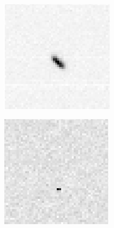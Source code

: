 \begin{figure}[!h]
\begin{subfigure}[t]{.23\textwidth}
        \caption{}
    \end{subfigure}
    \begin{subfigure}[t]{.23\textwidth}
        \centering
        \includegraphics[width=\textwidth]{images/mwrongImage26.png}
        \caption{}
        \label{fig:streakpointmis2}
    \end{subfigure}
    \begin{subfigure}[t]{.23\textwidth}
        \centering
        \includegraphics[width=\textwidth]{images/mwrongImage28.png}
        \caption{}
        \label{fig:cosmichotpixelmis}
    \end{subfigure}


\end{figure}
